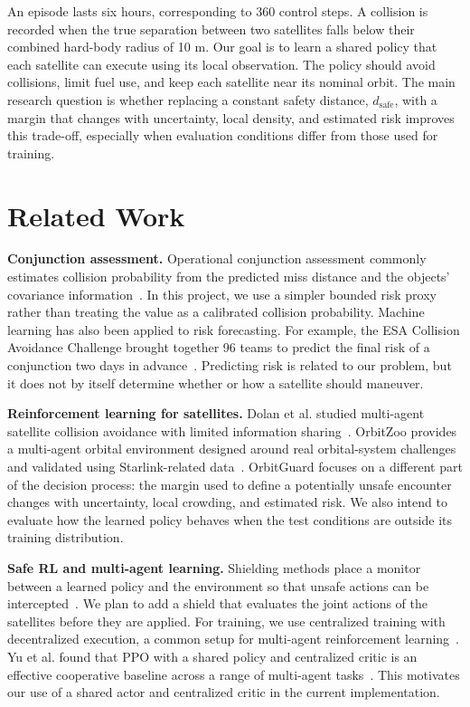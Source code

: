 \documentclass[conference]{IEEEtran}
\begin{document}
An episode lasts six hours, corresponding to 360 control steps. A collision is recorded when the true separation between two satellites falls below their combined hard-body radius of 10 m. Our goal is to learn a shared policy that each satellite can execute using its local observation. The policy should avoid collisions, limit fuel use, and keep each satellite near its nominal orbit. The main research question is whether replacing a constant safety distance, $d_{\text{safe}}$, with a margin that changes with uncertainty, local density, and estimated risk improves this trade-off, especially when evaluation conditions differ from those used for training.

\section{Related Work}
\label{sec:related}

\textbf{Conjunction assessment.}
Operational conjunction assessment commonly estimates collision probability from the predicted miss distance and the objects' covariance information~\cite{alfriend1999}. In this project, we use a simpler bounded risk proxy rather than treating the value as a calibrated collision probability. Machine learning has also been applied to risk forecasting. For example, the ESA Collision Avoidance Challenge brought together 96 teams to predict the final risk of a conjunction two days in advance~\cite{uriot2022}. Predicting risk is related to our problem, but it does not by itself determine whether or how a satellite should maneuver.

\textbf{Reinforcement learning for satellites.}
Dolan et al. studied multi-agent satellite collision avoidance with limited information sharing~\cite{dolan2023}. OrbitZoo provides a multi-agent orbital environment designed around real orbital-system challenges and validated using Starlink-related data~\cite{oliveira2025}. OrbitGuard focuses on a different part of the decision process: the margin used to define a potentially unsafe encounter changes with uncertainty, local crowding, and estimated risk. We also intend to evaluate how the learned policy behaves when the test conditions are outside its training distribution.

\textbf{Safe RL and multi-agent learning.}
Shielding methods place a monitor between a learned policy and the environment so that unsafe actions can be intercepted~\cite{alshiekh2018}. We plan to add a shield that evaluates the joint actions of the satellites before they are applied. For training, we use centralized training with decentralized execution, a common setup for multi-agent reinforcement learning~\cite{lowe2017}. Yu et al. found that PPO with a shared policy and centralized critic is an effective cooperative baseline across a range of multi-agent tasks~\cite{yu2022}. This motivates our use of a shared actor and centralized critic in the current implementation.
\end{document}
